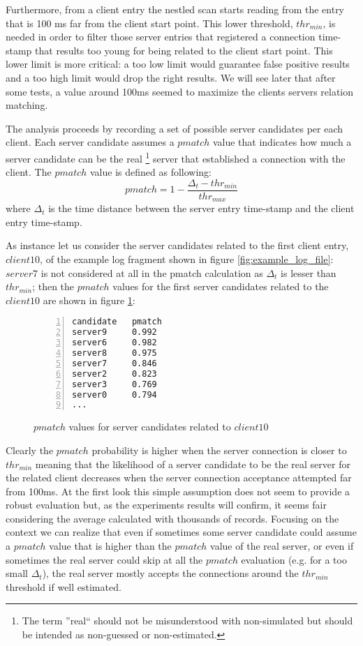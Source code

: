 Furthermore, from a client
entry the nestled scan starts reading from the entry that is 100 ms far
from the client start point. This lower threshold, $thr_{min}$, is needed in order to
 filter those server entries that registered a connection time-stamp
that results too young for being related to the client start point. This
lower limit is more critical: a too low limit would guarantee false
positive results and a too high limit would drop the right results.
We will see later that after some tests, a value around 100ms seemed to maximize 
the clients servers relation matching. %

The analysis proceeds by recording a set of possible server candidates 
 per each client. Each server candidate assumes a $pmatch$ value that
indicates how much a server candidate can be the real
\footnote{The term ''real`` should not be misunderstood with
non-simulated but should be intended as non-guessed or non-estimated.}
 server that
established a connection with the client. The $pmatch$ value is defined
as following:
\begin{equation}
pmatch = 1 - \frac{\Delta_t - thr_{min}}{thr_{max}}
\end{equation}
where $\Delta_t$ is the time distance between the server entry time-stamp and
the client entry time-stamp.

As instance let us consider the server candidates related to the first
client entry, $client10$, of the example log
fragment shown in figure \ref{fig:example_log_file}: 
$server7$ is not considered at all in the pmatch calculation  as $\Delta_t$ 
is lesser than $thr_{min}$; then the $pmatch$ values for the first server
candidates related to the $client10$ are shown in figure \ref{fig:pmatch}:
\begin{figure}[h]
\begin{lstlisting}[language=bash,frame=single, numbers=left]
candidate 	pmatch
server9 	0.992
server6 	0.982
server8 	0.975
server7  	0.846
server2  	0.823 
server3  	0.769
server0  	0.794
...
\end{lstlisting}
\caption{$pmatch$ values for server candidates related to $client10$}
\label{fig:pmatch}
\end{figure}

Clearly the $pmatch$ probability is higher when the server connection is
closer to $thr_{min}$ meaning that the likelihood of a server
candidate to be the real server for the related client decreases when
the server connection acceptance attempted far from 100ms. At the
first look this simple
assumption does not seem to provide a robust evaluation but, as the
experiments results will confirm, it seems fair considering the average
calculated with thousands of records. Focusing on the context we can realize that 
even if sometimes some server candidate could assume a $pmatch$ value
that is higher than the $pmatch$ value of the real server, or even if sometimes the
real server could skip at all the $pmatch$ evaluation (e.g.
for a too small $\Delta_t$), the real server mostly accepts
the connections around the $thr_{min}$ threshold if well
estimated.

